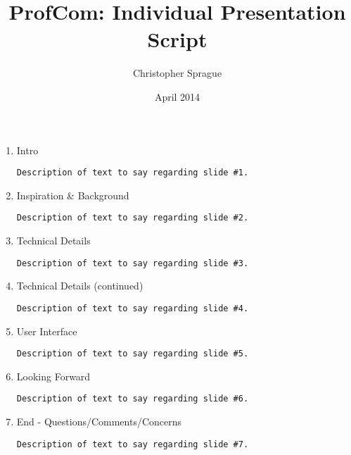 \documentclass{article}
\title{ProfCom: Individual Presentation Script}
\author{Christopher Sprague}
\date{April 2014}
\begin{document}
	\maketitle
	\begin{enumerate}
		\item Intro
			\begin{verbatim}
Description of text to say regarding slide #1.
			\end{verbatim}
		\item Inspiration \& Background
			\begin{verbatim}
Description of text to say regarding slide #2.
			\end{verbatim}
		\item Technical Details
			\begin{verbatim}
Description of text to say regarding slide #3.
			\end{verbatim}
		\item Technical Details (continued)
			\begin{verbatim}
Description of text to say regarding slide #4.
			\end{verbatim}
		\item User Interface
			\begin{verbatim}
Description of text to say regarding slide #5.
			\end{verbatim}
		\item Looking Forward
			\begin{verbatim}
Description of text to say regarding slide #6.
			\end{verbatim}
		\item End - Questions/Comments/Concerns
			\begin{verbatim}
Description of text to say regarding slide #7.
			\end{verbatim}
	\end{enumerate}
\end{document}
